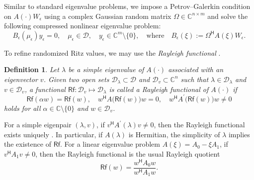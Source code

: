 \documentclass[a4paper,11pt]{article}
\newtheorem{definition}{Definition}
\newcommand{\Htran}{\mathsf{H}}
\newcommand{\Rq}{\mathsf{Rf}}
\newcommand{\defi}{:=}
\newcommand{\C}{\mathbb{C}}
\newcommand{\region}{\mathcal{D}}
\begin{document}
Similar to standard eigenvalue problems, we impose a Petrov--Galerkin condition on $A(\cdot)W_{\epsilon}$ using a complex Gaussian random matrix $\Omega\in\C^{n\times m}$ and solve the following compressed nonlinear eigenvalue problem:
\begin{equation}
    \label{eq:RRR}
    B_{\epsilon}(\mu_{\epsilon})y_{\epsilon} = 0,\quad 
    \mu_{\epsilon}\in\region,\quad 
    y_{\epsilon}\in\C^{m}\setminus\{0\},\quad\text{where}\quad 
    B_{\epsilon}(\xi) \defi \Omega^{\Htran}A(\xi)W_{\epsilon}.
\end{equation}

To refine randomized Ritz values, we may use the \emph{Rayleigh functional} \cite{Schwetlick2012}.
\begin{definition}
    \label{def:Rf}
    Let $\lambda$ be a simple eigenvalue of $A(\cdot)$ associated with an eigenvector $v$. Given two open sets $\region_{\lambda}\subset \region$ and $\region_{v}\subset \C^{n}$ such that $\lambda\in\region_{\lambda}$ and $v\in\region_{v}$, a functional $\Rq\colon \region_{v}\mapsto \region_{\lambda}$ is called a Rayleigh functional of $A(\cdot)$ if
    \begin{equation*}
        \Rq(\alpha w)=\Rq(w),\quad 
        w^{\Htran}A\bigl(\Rq(w)\bigr)w= 0,\quad 
        w^{\Htran}A^{\prime}\bigl(\Rq(w)\bigr)w\neq 0
    \end{equation*}
    holds for all $ \alpha\in\C\setminus\{0\}$ and $w\in\region_{v}$.
\end{definition}

For a simple eigenpair $(\lambda,v)$, if $v^{\Htran}A^{\prime}(\lambda)v\neq 0$, then the Rayleigh functional exists uniquely \cite[Thm.~21]{Schwetlick2012}. In particular, if $A(\lambda)$ is Hermitian, the simplicity of $\lambda$ implies the existence of $\Rq$. For a linear eigenvalue problem $A(\xi)=A_{0}-\xi A_{1}$, if $v^{\Htran}A_{1}v\neq 0$, then the Rayleigh functional is the usual Rayleigh quotient
\begin{equation*}
    \Rq(w) = \frac{w^{\Htran}A_{0}w}{w^{\Htran}A_{1}w}.
\end{equation*} 
\end{document}
